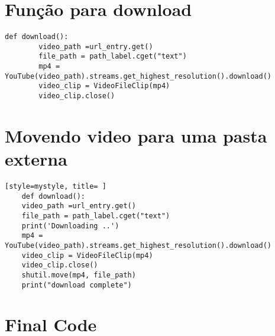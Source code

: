 \documentclass[letterpaper]{article}
\begin{document}
\section{Função para download}

\begin{lstlisting}[style=pythonStyle, title= 7 a 12] 
    def download():
        video_path =url_entry.get()
        file_path = path_label.cget("text")
        mp4 = YouTube(video_path).streams.get_highest_resolution().download()
        video_clip = VideoFileClip(mp4)
        video_clip.close()
\end{lstlisting}

\section{Movendo video para uma pasta externa }
\begin{lstlisting}[style=mystyle, title= ] 
    def download():
    video_path =url_entry.get()
    file_path = path_label.cget("text")
    print('Downloading ..')
    mp4 = YouTube(video_path).streams.get_highest_resolution().download()
    video_clip = VideoFileClip(mp4)
    video_clip.close()
    shutil.move(mp4, file_path)
    print("download complete")
\end{lstlisting}

\section{Final Code}

\end{document}
